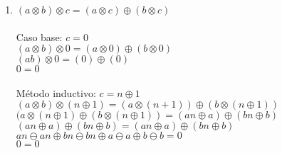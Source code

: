 \documentclass{article}
\begin{document}
\begin{enumerate}
\item $(a \otimes b) \otimes c = (a \otimes c) \oplus (b \otimes c)$
\\\\Caso base: $c = 0$
\\$(a \otimes b) \otimes 0 = (a \otimes 0) \oplus (b \otimes 0)$
\\$(ab) \otimes 0 = (0) \oplus (0)$
\\$0 = 0$
\\\\Método inductivo: $c = n \oplus 1$
\\$(a \otimes b) \otimes (n \oplus 1) = (a \otimes (n + 1)) \oplus (b \otimes (n \oplus 1))$
\\$(a \otimes (n \oplus 1) \oplus (b \otimes (n \oplus 1)) = (an \oplus a) \oplus (bn \oplus b)$
\\$(an \oplus a) \oplus (bn \oplus b) = (an \oplus a) \oplus (bn \oplus b)$
\\$an \ominus an \oplus bn \ominus bn \oplus a \ominus a \oplus b \ominus b = 0$
\\$0 = 0$

\end{enumerate}
\end{document}
